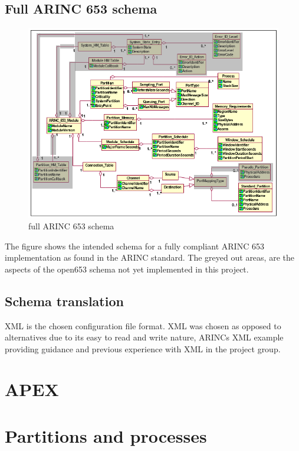 \subsection{Full ARINC 653 schema}

\begin{figure}[H]
	\includegraphics{figures/originalschema.png}
	\caption{full ARINC 653 schema}
	\label{fig:arinc653schema}
\end{figure}

The figure shows the intended schema for a fully compliant ARINC 653 implementation as found in the ARINC standard.  The greyed out areas, are the aspects of the open653 schema not yet implemented in this project. 

\subsection{Schema translation}

XML is the chosen configuration file format. XML was chosen as opposed to alternatives due to its easy to read and write nature, ARINC\textquotesingle s XML example providing guidance and previous experience with XML in the project group.

\section{APEX}

\section{Partitions and processes}

